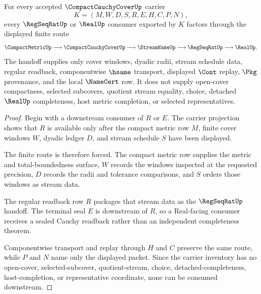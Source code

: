 \begin{theorem}
\label{thm:compact-cauchy-cover-regular-handoff}
For every accepted $\CompactCauchyCoverUp$ carrier
$$
K=(M,W,D,S,R,E,H,C,P,N),
$$
every $\RegSeqRatUp$ or $\RealUp$ consumer exported by $K$ factors through the displayed finite route
$$
\CompactMetricUp \longrightarrow \CompactCauchyCoverUp \longrightarrow \StreamNameUp \longrightarrow \RegSeqRatUp \longrightarrow \RealUp .
$$
The handoff supplies only cover windows, dyadic radii, stream schedule data, regular readback, componentwise $\hsame$ transport, displayed $\Cont$ replay, $\Pkg$ provenance, and the local $\NameCert$ row. It does not supply open-cover compactness, selected subcovers, quotient stream equality, choice, detached $\RealUp$ completeness, host metric completion, or selected representatives.
\end{theorem}
\begin{proof}
Begin with a downstream consumer of $R$ or $E$. The carrier projection shows that $R$ is available only after the compact metric row $M$, finite cover windows $W$, dyadic ledger $D$, and stream schedule $S$ have been displayed.

The finite route is therefore forced. The compact metric row supplies the metric and total-boundedness surface, $W$ records the windows inspected at the requested precision, $D$ records the radii and tolerance comparisons, and $S$ orders those windows as stream data.

The regular readback row $R$ packages that stream data as the $\RegSeqRatUp$ handoff. The terminal seal $E$ is downstream of $R$, so a Real-facing consumer receives a sealed Cauchy readback rather than an independent completeness theorem.

Componentwise transport and replay through $H$ and $C$ preserve the same route, while $P$ and $N$ name only the displayed packet. Since the carrier inventory has no open-cover, selected-subcover, quotient-stream, choice, detached-completeness, host-completion, or representative coordinate, none can be consumed downstream.
\end{proof}



